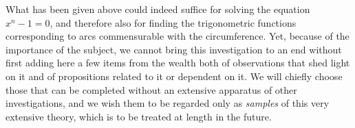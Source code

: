 What has been given above could indeed suffice for solving the equation \mbox{\(x^n-1=0\)}, and therefore also for finding the trigonometric functions corresponding to arcs commensurable with the circumference. Yet, because of the importance of the subject, we cannot bring this investigation to an end without first adding here a few items from the wealth both of observations that shed light on it and of propositions related to it or dependent on it. We will chiefly choose those that can be completed without an extensive apparatus of other investigations, and we wish them to be regarded only as \textit{samples} of this very extensive theory, which is to be treated at length in the future.

